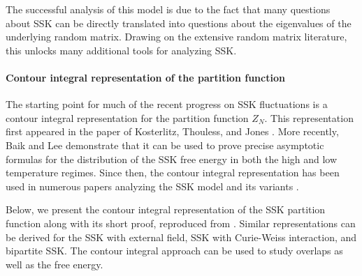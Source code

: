 \documentclass[11pt]{article}
\numberwithin{equation}{section}
\theoremstyle{remark}
\begin{document}
The successful analysis of this model is due to the fact that many questions about SSK can be directly translated into questions about the eigenvalues of the underlying random matrix.  Drawing on the extensive random matrix literature, this unlocks many additional tools for analyzing SSK.

\paragraph{Contour integral representation of the partition function}
The starting point for much of the recent progress on SSK fluctuations is a contour integral representation for the partition function $Z_N$.  This representation first appeared in the paper of Kosterlitz, Thouless, and Jones \cite{kosterlitz1976spherical}.  More recently, Baik and Lee \cite{BL16} demonstrate that it can be used to prove precise asymptotic formulas for the distribution of the SSK free energy in both the high and low temperature regimes.  Since then, the contour integral representation has been used in numerous papers analyzing the SSK model and its variants \cite{BL16,BL17,BLW18,BL20,Baiketal21,CW21,CWL_BSSK,JKOP2,landon2020fluctuations,LS22,Landon22,nguyen2018central}.

Below, we present the contour integral representation of the SSK partition function along with its short proof, reproduced from \cite{BL16}.  Similar representations can be derived for the SSK with external field, SSK with Curie-Weiss interaction, and bipartite SSK.  The contour integral approach can be used to study overlaps as well as the free energy.
\end{document}
